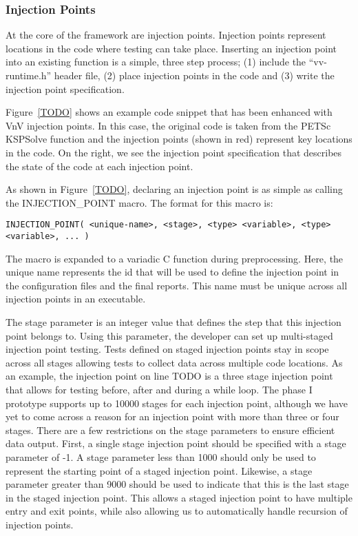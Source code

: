 \subsubsection{Injection Points}

At the core of the framework are injection points. Injection points represent locations in the code where \VV testing can take place. Inserting an injection 
point into an existing function is a simple, three step process; (1) include the ``vv-runtime.h'' header file, (2) place injection points in the code and (3) write the injection point specification. 

Figure~\ref{TODO} shows an example code 
snippet that has been enhanced with VnV injection points. In this case, the original code is taken from the PETSc KSPSolve function and the injection points (shown in red) represent 
key locations in the code. On the right, we see the injection point specification that describes the state of the code at each injection point.  

As shown in Figure~\ref{TODO}, declaring an injection point is as simple as calling the INJECTION\_POINT macro. The format for this macro is:

\begin{verbatim} 
INJECTION_POINT( <unique-name>, <stage>, <type> <variable>, <type> <variable>, ... )
\end{verbatim}

The macro is expanded to a variadic C function during preprocessing. Here, the unique name represents the id that will be used to define the injection point in the configuration files and the final reports. This name must 
be unique across all injection points in an executable. 

The stage parameter is an integer value that defines the step that this injection point belongs to. Using this parameter, the developer can set up multi-staged injection point testing. Tests defined on staged injection points stay in scope across 
all stages allowing tests to collect data across multiple code locations. As an example, the injection point on line TODO is a three stage injection point that allows for testing before, after and during a while loop. The phase I prototype supports up to 10000 stages for each injection point, although we have yet to come across a reason for an injection point with more than three or four stages. There are a few restrictions on the stage parameters to ensure efficient data output. First, a single stage injection point should be specified with a stage parameter of -1. A stage parameter less than 1000 should only be used to represent the starting point of a staged injection point. Likewise, a stage parameter greater than 9000 should be used to indicate that this is the last stage in the staged injection point. This allows a staged injection point to have multiple entry and exit points, while also allowing us to automatically handle recursion of injection points.  

